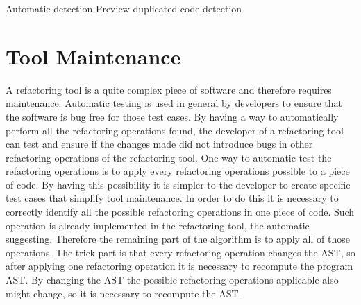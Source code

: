 Automatic detection
Preview
duplicated code detection
\section{Tool Maintenance} %



A refactoring tool is a quite complex piece of software and therefore requires maintenance.
Automatic testing is used in general by developers to ensure that the software
is bug free for those test cases.
By having a way to automatically perform all the refactoring operations found,
the developer of a refactoring tool can test and ensure if the changes made did not introduce
bugs in other refactoring operations of the refactoring tool.
One way to automatic test the refactoring operations is to apply every refactoring
operations possible to a piece of code. By having this possibility it is simpler
to the developer to create specific test cases that simplify tool maintenance.
In order to do this it is necessary to correctly identify all the possible refactoring
operations in one piece of code. Such operation is already implemented in the refactoring
tool, the automatic suggesting.
Therefore the remaining part of the algorithm is to apply all of those operations.
The trick part is  that every refactoring operation changes the AST, so after
applying one refactoring operation it is necessary to recompute the program AST.
By changing the AST the possible refactoring operations applicable also might change,
so it is necessary to recompute the AST.


